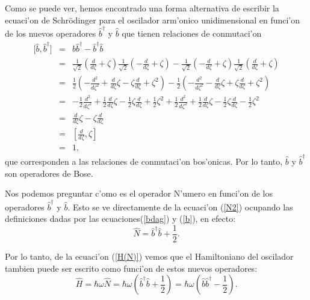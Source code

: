 Como se puede ver, hemos encontrado una forma alternativa de escribir la
ecuaci'on de Schr\"{o}dinger para el oscilador arm'onico unidimensional
en funci'on de los nuevos operadores $\hat{b}^{\dagger}$ y $\hat{b}$ que
tienen relaciones de conmutaci'on%
\begin{eqnarray}
\lbrack\hat{b},\hat{b}^{\dagger}] & = &\hat{b}\hat{b}^{\dagger}-\hat
{b}^{\dagger}\hat{b}\\
& = &\frac{1}{\sqrt{2}}\left( \frac{d}{d\zeta}+\zeta\right)
\frac{1}{\sqrt{2}}\left( -\frac{d}{d\zeta}+\zeta\right)
-\frac{1}{\sqrt{2}}\left( -\frac{d}{d\zeta}+\zeta\right)
\frac{1}{\sqrt{2}}\left( \frac{d}{d\zeta}+\zeta\right)\\
& = &\frac{1}{2}\left( -\frac{d^{2}}{d\zeta^{2}}+\frac{d}{d\zeta
}\zeta-\zeta\frac{d}{d\zeta}+\zeta^{2}\right)
-\frac{1}{2}\left( -\frac{d^{2}}{d\zeta^{2}}-\frac{d}{d\zeta}%
\zeta+\zeta\frac{d}{d\zeta}+\zeta^{2}\right)\\
& = &-\frac{1}{2}\frac{d^{2}}{d\zeta^{2}}+\frac{1}{2}\frac{d}%
{d\zeta}\zeta-\frac{1}{2}\zeta\frac{d}{d\zeta}+\frac{1}%
{2}\zeta^{2}+\frac{1}{2}\frac{d^{2}}{d\zeta^{2}}+\frac{1}{2}%
\frac{d}{d\zeta}\zeta-\frac{1}{2}\zeta\frac{d}{d\zeta
}-\frac{1}{2}\zeta^{2}\\
& = &\frac{d}{d\zeta}\zeta-\zeta\frac{d}{d\zeta
}\\
& = &[\frac{d}{d\zeta},\zeta]\\
& = &1\label{[b,bdag]} ,
\end{eqnarray}
que corresponden a las relaciones de conmutaci'on bos'onicas. Por lo
tanto, $\hat{b}$ y $\hat{b}^{\dagger}$ son operadores de Bose.

Nos podemos preguntar c'omo es el operador N'umero en funci'on de los
operadores $\hat{b}^{\dagger}$ y $\hat{b}.$ Esto se ve directamente de la
ecuaci'on (\ref{N2}) ocupando las definiciones dadas por las ecuaciones(\ref{bdag}) y
(\ref{b}), en efecto:%
\begin{equation}
\hat{N}=\hat{b}^{\dagger}\hat{b}+\frac{1}{2}\label{N3} .
\end{equation}


Por lo tanto, de la ecuaci'on (\ref{H(N)}) vemos que el Hamiltoniano del oscilador
tambien puede ser escrito como funci'on de estos nuevos operadores:%
\begin{equation}
\hat{H}=\hbar\omega\hat{N}=\hbar\omega\left( \hat{b}^{\dagger}\hat{b}%
+\frac{1}{2}\right) =\hbar\omega\left( \hat{b}\hat{b}^{\dagger}-\frac{1}%
{2}\right) \label{H(bdagb)} .
\end{equation}


